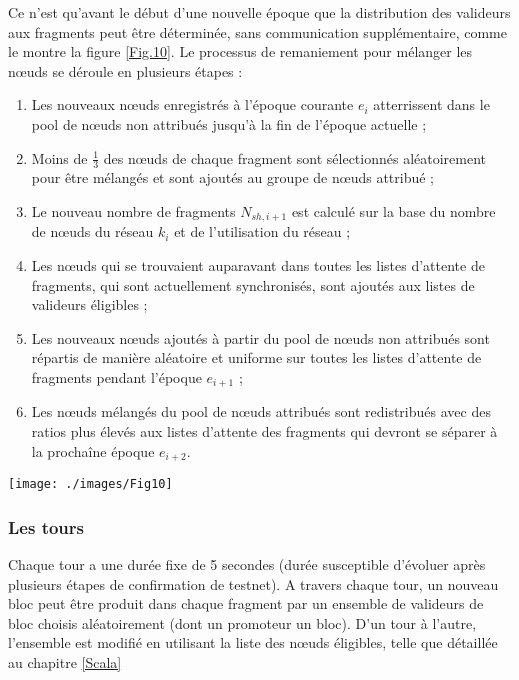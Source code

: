 \documentclass[journal]{IEEEtran}
\begin{document}
Ce n'est qu'avant le début d'une nouvelle époque que la distribution des valideurs aux fragments peut être déterminée, sans communication supplémentaire, comme le montre la figure \ref{Fig.10}.
Le processus de remaniement pour mélanger les nœuds se déroule en plusieurs étapes :
\begin{enumerate}
  \item Les nouveaux nœuds enregistrés à l'époque courante ${e}_{i}$ atterrissent dans le pool de nœuds non attribués jusqu'à la fin de l'époque actuelle ;
  \item Moins de $\frac{1}{3}$ des nœuds de chaque fragment sont sélectionnés aléatoirement  pour être mélangés et sont ajoutés au groupe de nœuds attribué ;
  \item Le nouveau nombre de fragments ${N}_{sh,i+1}$ est calculé sur la base du nombre de nœuds du réseau ${k}_{i}$ et de l'utilisation du réseau ;
  \item Les nœuds qui se trouvaient auparavant dans toutes les listes d'attente de fragments, qui sont actuellement synchronisés, sont ajoutés aux listes de valideurs éligibles ;
  \item Les nouveaux nœuds ajoutés à partir du pool de nœuds non attribués sont répartis de manière aléatoire et uniforme sur toutes les listes d'attente de fragments pendant l'époque ${e}_{i+1}$ ;
  \item Les nœuds mélangés du pool de nœuds attribués sont redistribués avec des ratios plus élevés aux listes d'attente des fragments qui devront se séparer à la prochaîne  époque ${e}_{i+2}$.
\end{enumerate}

\begin{figure*}[h]
         \centering
	\texttt{[image: ./images/Fig10]} %
	\caption{Remaniement des nœuds à la fin de chaque époque} %
	\label{Fig.10} %
\end{figure*}

\subsubsection{Les tours} 
Chaque tour a une durée fixe de 5 secondes (durée susceptible d'évoluer après plusieurs étapes de confirmation de testnet). A travers chaque tour, un nouveau bloc peut être produit dans chaque fragment par un ensemble de valideurs de bloc choisis aléatoirement (dont un promoteur un bloc). D'un tour à l'autre, l'ensemble est modifié en utilisant la liste des nœuds éligibles, telle que détaillée au chapitre \ref{Scala}
\end{document}
